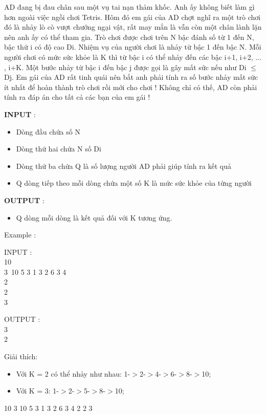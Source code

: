 



   AD đang bị đau chân sau một vụ tai nạn thảm khốc. Anh ấy không biết làm gì hơn ngoài việc ngồi chơi Tetris. Hôm đó em gái của AD chợt nghĩ ra một trò chơi đó là nhảy lò cò vượt chướng ngại vật, rất may mắn là vẫn còn một chân lành lặn nên anh ấy có thể tham gia. Trò chơi được chơi trên N bậc đánh số từ 1 đến N, bậc thứ i có độ cao Di. Nhiệm vụ của người chơi là nhảy từ bậc 1 đến bậc N. Mỗi người chơi có mức sức khỏe là K thì từ bậc i có thể nhảy đến các bậc i+1, i+2, ... , i+K. Một bước nhảy từ bậc i đến bậc j được gọi là gây mất sức nếu như Di  $\le$  Dj. Em gái của AD rất tinh quái nên bắt anh phải tính ra số bước nhảy mất sức ít nhất để hoàn thành trò chơi rồi mới cho chơi ! Không chỉ có thế, AD còn phải tính ra đáp án cho tất cả các bạn của em gái !  

\textbf{    INPUT   }   :  
\begin{itemize}
	\item     Dòng đầu chứa số N   
	\item     Dòng thứ hai chứa N số Di   
	\item     Dòng thứ ba chứa Q là số lượng người AD phải giúp tính ra kết quả   
	\item     Q dòng tiếp theo mỗi dòng chứa một số K là mức sức khỏe của từng người   
\end{itemize}

\textbf{    OUTPUT   }   :  
\begin{itemize}
	\item     Q dòng mỗi dòng là kết quả đối với K tương ứng.   
\end{itemize}

    Example      :  

INPUT   :   
\\   10   
\\   3 10 5 3 1 3 2 6 3 4   
\\   2   
\\   2   
\\   3  

OUTPUT   :   
\\   3   
\\   2  

   Giải thích:  
\begin{itemize}
	\item     Với K = 2 có thể nhảy như nhau: 1-$>$2-$>$4-$>$6-$>$8-$>$10;   
	\item     Với K = 3: 1-$>$2-$>$5-$>$8-$>$10;   
\end{itemize}     10       3 10 5 3 1 3 2 6 3 4       2       2       3    


